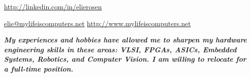 \documentclass[10pt,a4paper]{article}
\begin{document}
\sloppy %

\centerline{\noindent\href{http://www.linkedin.com/in/elierosen}{http://linkedin.com/in/elierosen}}

\nobreakvspace{0.3em} %

\noindent\href{mailto:elie@mylifeiscomputers.net}{elie\mbox{}@\mbox{}mylifeiscomputers.net} \hfill \href{http://www.mylifeiscomputers.net}{http://www.mylifeiscomputers.net} \\

\spacedhrule{-0.6em}{-0.4em} %

\headedsection
{\textbf{\emph{\small{My experiences and hobbies have allowed me to sharpen my hardware engineering skills in these areas: VLSI,  FPGAs, ASICs, Embedded Systems, Robotics, and Computer Vision. I am willing to relocate for a full-time position.} }}}


\spacedhrule{0.6em}{-0.4em}


	
		{}

		{}
\end{document}

